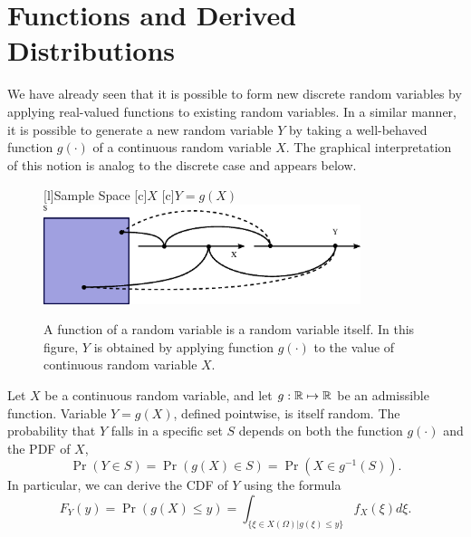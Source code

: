 \chapter{Functions and Derived Distributions}

We have already seen that it is possible to form new discrete random variables by applying real-valued functions to existing random variables.
In a similar manner, it is possible to generate a new random variable $Y$ by taking a well-behaved function $g(\cdot)$ of a continuous random variable $X$.
The graphical interpretation of this notion is analog to the discrete case and appears below.

\begin{figure}[ht]
\begin{center}
\begin{psfrags}
[l]{Sample Space}
[c]{$X$}
[c]{$Y = g(X)$}
\includegraphics[width=9.26cm]{Figures/9Chapter/fcn}
\end{psfrags}
\caption{A function of a random variable is a random variable itself.
In this figure, $Y$ is obtained by applying function $g(\cdot)$ to the value of continuous random variable $X$.}
\end{center}
\end{figure}

Let $X$ be a continuous random variable, and let $g: \mathbb{R} \mapsto \mathbb{R}$ be an admissible function.
Variable $Y = g(X)$, defined pointwise, is itself random.
The probability that $Y$ falls in a specific set $S$ depends on both the function $g(\cdot)$ and the PDF of $X$,
\begin{equation*}
\Pr (Y \in S) = \Pr (g(X) \in S) 
= \Pr \left( X \in g^{-1}(S) \right).
\end{equation*}
In particular, we can derive the CDF of $Y$ using the formula
\begin{equation} \label{equation:DerivedCDF}
F_Y(y) = \Pr (g(X) \leq y) = \int_{ \{ \xi \in X(\Omega) | g(\xi) \leq y \} } f_X(\xi) d\xi .
\end{equation}

